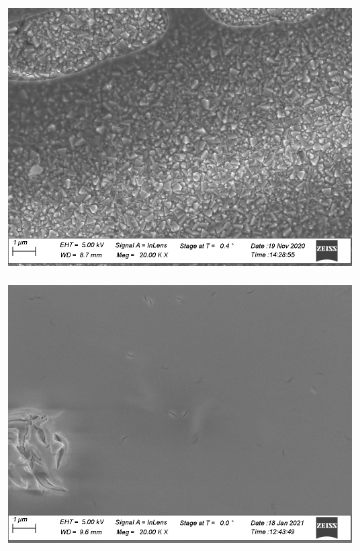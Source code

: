 \begin{figure}[bht]
    \centering
    \begin{subfigure}{.45\textwidth}
        \centering
        \includegraphics[width=.99\textwidth]{Pics/sem/071_fto_old_2x.png}
		\caption{}%
		\label{fig:sem-old}
    \end{subfigure}
    \begin{subfigure}{.45\textwidth}
        \centering
        \includegraphics[width=.99\textwidth]{Pics/sem/147_steel_ph_10x.png}
		\caption{}%
		\label{fig:sem-ph}
    \end{subfigure}

\end{figure}
